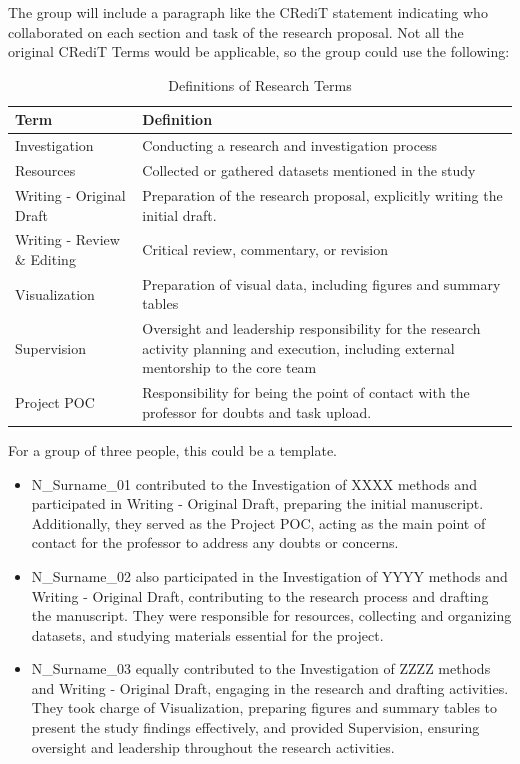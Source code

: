 \documentclass[11pt]{article}
\begin{document}
The group will include a paragraph like the CRediT statement indicating who collaborated on each section and task of the research proposal. Not all the original CRediT Terms would be applicable, so the group could use the following:

\begin{table}[ht]
\centering
\begin{tabular}{|l|p{10cm}|}
\hline
\textbf{Term} & \textbf{Definition} \\ \hline
Investigation & Conducting a research and investigation process \\ \hline
Resources & Collected or gathered datasets mentioned in the study \\ \hline
Writing - Original Draft & Preparation of the research proposal, explicitly writing the initial draft. \\ \hline
Writing - Review \& Editing & Critical review, commentary, or revision \\ \hline
Visualization & Preparation of visual data, including figures and summary tables \\ \hline
Supervision & Oversight and leadership responsibility for the research activity planning and execution, including external mentorship to the core team \\ \hline
Project POC & Responsibility for being the point of contact with the professor for doubts and task upload. \\ \hline
\end{tabular}
\caption{Definitions of Research Terms}
\label{tab:definitions}
\end{table}


For a group of three people, this could be a template.
\begin{itemize}
\item N\_Surname\_01 contributed to the Investigation of XXXX methods and participated in Writing - Original Draft, preparing the initial manuscript. Additionally, they served as the Project POC, acting as the main point of contact for the professor to address any doubts or concerns.

\item N\_Surname\_02 also participated in the Investigation of YYYY methods and Writing - Original Draft, contributing to the research process and drafting the manuscript. They were responsible for resources, collecting and organizing datasets, and studying materials essential for the project.

\item N\_Surname\_03 equally contributed to the Investigation of ZZZZ methods and Writing - Original Draft, engaging in the research and drafting activities. They took charge of Visualization, preparing figures and summary tables to present the study findings effectively, and provided Supervision, ensuring oversight and leadership throughout the research activities.
 
\end{itemize}
\end{document}
